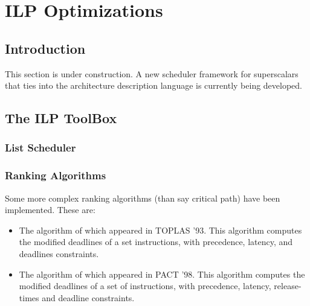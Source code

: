 \section{ILP Optimizations}
\subsection{Introduction}
    This section is under construction.  A new scheduler framework
for superscalars that ties into the architecture description language
is currently being developed.
\subsection{The ILP ToolBox}
\subsubsection{List Scheduler}
\subsubsection{Ranking Algorithms}
   Some more complex ranking algorithms (than say critical path) have been
implemented.  These are:
\begin{itemize}
 \item The algorithm of
  which appeared in TOPLAS '93.  This algorithm
      computes the modified deadlines of a set instructions, with
      precedence, latency, and deadlines constraints.
      
 \item The algorithm of 
       which appeared in PACT '98.
      This algorithm computes the modified deadlines of a set of instructions,
      with precedence, latency, release-times and deadline constraints.
\end{itemize}
